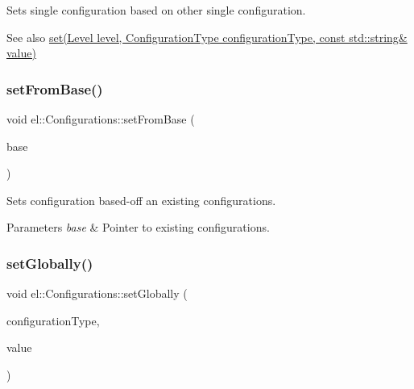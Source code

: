 Sets single configuration based on other single configuration. 

\begin{DoxySeeAlso}{See also}
\hyperlink{classel_1_1_configurations_a332717de96efc851a202b7afcc5e395c}{set(\+Level level, Configuration\+Type configuration\+Type, const std\+::string\& value)} 
\end{DoxySeeAlso}
\mbox{\label{classel_1_1_configurations_a4c6db218908b39d23cc09b1a16a18e83}} 
\subsubsection{\texorpdfstring{set\+From\+Base()}{setFromBase()}}
{\footnotesize\ttfamily void el\+::\+Configurations\+::set\+From\+Base (\begin{DoxyParamCaption}\item[{\hyperlink{classel_1_1_configurations}{Configurations} $\ast$}]{base }\end{DoxyParamCaption})\hspace{0.3cm}{\ttfamily [inline]}}



Sets configuration based-\/off an existing configurations. 


\begin{DoxyParams}{Parameters}
{\em base} & Pointer to existing configurations. \\
\hline
\end{DoxyParams}
\mbox{\label{classel_1_1_configurations_a56c82c15ea39cc230a5c85ec2c41cbfd}} 
\subsubsection{\texorpdfstring{set\+Globally()}{setGlobally()}}
{\footnotesize\ttfamily void el\+::\+Configurations\+::set\+Globally (\begin{DoxyParamCaption}\item[{\hyperlink{namespaceel_a281f5db6d6163678bc68a8b23b59e124}{Configuration\+Type}}]{configuration\+Type,  }\item[{const std\+::string \&}]{value }\end{DoxyParamCaption})\hspace{0.3cm}{\ttfamily [inline]}}



